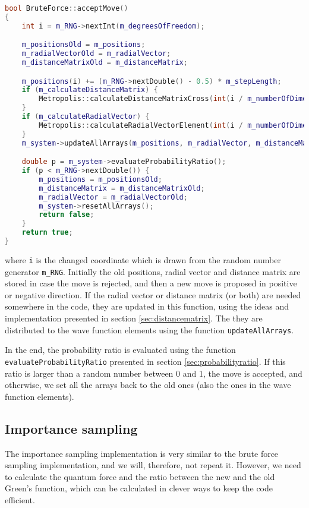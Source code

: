 \begin{lstlisting}[language=c++]
bool BruteForce::acceptMove()
{
	int i = m_RNG->nextInt(m_degreesOfFreedom);

	m_positionsOld = m_positions;
	m_radialVectorOld = m_radialVector;
	m_distanceMatrixOld = m_distanceMatrix;

	m_positions(i) += (m_RNG->nextDouble() - 0.5) * m_stepLength;
	if (m_calculateDistanceMatrix) {
		Metropolis::calculateDistanceMatrixCross(int(i / m_numberOfDimensions));
	}
	if (m_calculateRadialVector) {
		Metropolis::calculateRadialVectorElement(int(i / m_numberOfDimensions));
	}
	m_system->updateAllArrays(m_positions, m_radialVector, m_distanceMatrix, i);

	double p = m_system->evaluateProbabilityRatio();
	if (p < m_RNG->nextDouble()) {
		m_positions = m_positionsOld;
		m_distanceMatrix = m_distanceMatrixOld;
		m_radialVector = m_radialVectorOld;
		m_system->resetAllArrays();
		return false;
	}
	return true;
}
\end{lstlisting}
where \lstinline|i| is the changed coordinate which is drawn from the random number generator \lstinline|m_RNG|. Initially the old positions, radial vector and distance matrix are stored in case the move is rejected, and then a new move is proposed in positive or negative direction. If the radial vector or distance matrix (or both) are needed somewhere in the code, they are updated in this function, using the ideas and implementation presented in section \ref{sec:distancematrix}. The they are distributed to the wave function elements using the function \lstinline|updateAllArrays|.

In the end, the probability ratio is evaluated using the function \lstinline|evaluateProbabilityRatio| presented in section \ref{sec:probabilityratio}. If this ratio is larger than a random number between 0 and 1, the move is accepted, and otherwise, we set all the arrays back to the old ones (also the ones in the wave function elements). 

\subsection{Importance sampling}
The importance sampling implementation is very similar to the brute force sampling implementation, and we will, therefore, not repeat it. However, we need to calculate the quantum force and the ratio between the new and the old Green's function, which can be calculated in clever ways to keep the code efficient. 

